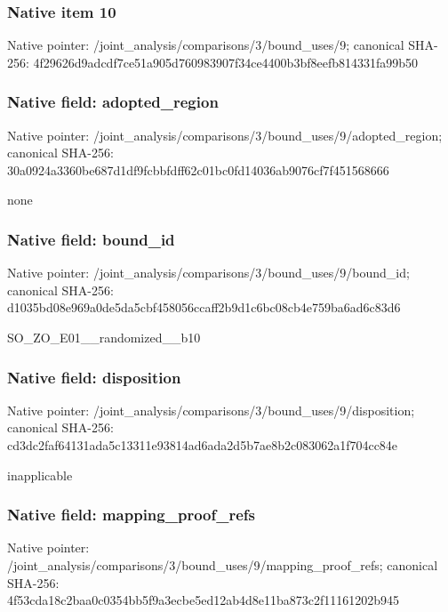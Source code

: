 \documentclass[10pt,a4paper]{article}
\begin{document}
\subsubsection{Native item 10}
Native pointer: /joint\_\allowbreak{}analysis/comparisons/3/bound\_\allowbreak{}uses/9; canonical SHA-256: 4f29626d9adcdf7ce51a905d760983907f34ce4400b3bf8eefb814331fa99b50

\subsubsection{Native field: adopted\_\allowbreak{}region}
Native pointer: /joint\_\allowbreak{}analysis/comparisons/3/bound\_\allowbreak{}uses/9/adopted\_\allowbreak{}region; canonical SHA-256: 30a0924a3360be687d1df9fcbbfdff62c01bc0fd14036ab9076cf7f451568666

\begingroup\raggedright\sloppy none\par\endgroup

\subsubsection{Native field: bound\_\allowbreak{}id}
Native pointer: /joint\_\allowbreak{}analysis/comparisons/3/bound\_\allowbreak{}uses/9/bound\_\allowbreak{}id; canonical SHA-256: d1035bd08e969a0de5da5cbf458056ccaff2b9d1c6bc08cb4e759ba6ad6c83d6

\begingroup\raggedright\sloppy SO\_\allowbreak{}ZO\_\allowbreak{}E01\_\allowbreak{}\_\allowbreak{}randomized\_\allowbreak{}\_\allowbreak{}b10\par\endgroup

\subsubsection{Native field: disposition}
Native pointer: /joint\_\allowbreak{}analysis/comparisons/3/bound\_\allowbreak{}uses/9/disposition; canonical SHA-256: cd3dc2faf64131ada5c13311e93814ad6ada2d5b7ae8b2c083062a1f704cc84e

\begingroup\raggedright\sloppy inapplicable\par\endgroup

\subsubsection{Native field: mapping\_\allowbreak{}proof\_\allowbreak{}refs}
Native pointer: /joint\_\allowbreak{}analysis/comparisons/3/bound\_\allowbreak{}uses/9/mapping\_\allowbreak{}proof\_\allowbreak{}refs; canonical SHA-256: 4f53cda18c2baa0c0354bb5f9a3ecbe5ed12ab4d8e11ba873c2f11161202b945
\end{document}

